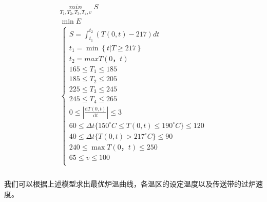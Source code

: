 \documentclass[../main.tex]{subfiles}
\begin{document}
\begin{align}
    \begin{array}{c}
        \underset{T_1,T_2,T_3,T_4,v}{min}\,\,S\\
        \min E\\
        \left\{ \begin{array}{l}
        S=\int_{t_1}^{t_2}{\left( T\left( 0,t \right) -217 \right)}dt\\
        t_1=\min \left\{ t|T\ge 217 \right\}\\
        t_2=maxT\left( 0，t \right)\\
        165\leq T_1\leq 185\\
        185\leq T_2\leq 205\\
        225\leq T_3\leq 245\\
        245\leq T_4\leq 265\\
        0\leq \left| \frac{\text{d}T\left( 0,t \right)}{\text{d}t} \right|\leq 3\\
        60\leq \Delta t\{150^{\circ}C\leq T\left( 0,t \right) \leq 190^{\circ}C\}\leq 120\\
        40\leq \Delta t\{T\left( 0,t \right) >217^{\circ}C\}\leq 90\\
        240\leq \max T\left( 0，t \right) \leq 250\\
        65\leq v\leq 100\\
    \end{array} \right.\\
    \end{array}
\end{align}
\par 我们可以根据上述模型求出最优炉温曲线，各温区的设定温度以及传送带的过炉速度。
\end{document}
